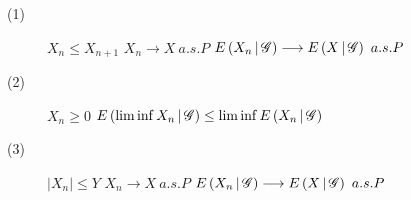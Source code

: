 	\begin{screen}
		\begin{thm}
			\begin{description}
				\item[(1)]
					$X_n \leq X_{n+1}$
					$X_n \longrightarrow X\ a.s.P$
					$E\left( X_n \, \middle|\, \mathscr{G} \right) \longrightarrow E\left( X \, \middle|\, \mathscr{G} \right)\ a.s.P$
				\item[(2)]
					$X_n \geq 0$
					$E\left( \liminf X_n \, \middle|\, \mathscr{G} \right) \leq \liminf E\left( X_n \, \middle|\, \mathscr{G} \right)$
				\item[(3)]
					$|X_n| \leq Y$ $X_n \longrightarrow X\ a.s.P$
					$E\left( X_n \, \middle|\, \mathscr{G} \right) \longrightarrow E\left( X \, \middle|\, \mathscr{G} \right)\ a.s.P$
			\end{description}
		\end{thm}
	\end{screen}